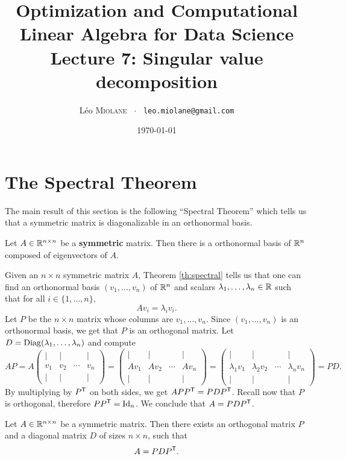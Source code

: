 \documentclass[11pt,nocut]{article}
\title{\vspace{-2.0cm}%
	Optimization and Computational Linear Algebra for Data Science\\
Lecture 7: Singular value decomposition}
\author{Léo \textsc{Miolane} \ $\cdot$ \ \texttt{leo.miolane@gmail.com}}
\date{\today}
\begin{document}
\maketitle


\section{The Spectral Theorem}

The main result of this section is the following ``Spectral Theorem'' which tells us that a symmetric matrix is diagonalizable in an orthonormal basis.

\begin{theorem}\label{th:spectral}
	Let $A \in \mathbb{R}^{n \times n}$ be a \textbf{symmetric} matrix. Then there is a orthonormal basis of $\mathbb{R}^n$ composed of eigenvectors of $A$.
\end{theorem}

Given an $n \times n$ symmetric matrix $A$, Theorem \ref{th:spectral} tells us that one can find an orthonormal basis $(v_1, \dots, v_n)$ of $\mathbb{R}^n$ and scalars $\lambda_1, \dots, \lambda_n \in \mathbb{R}$ such that for all $i \in \{1, \dots, n\}$,
$$
A v_i = \lambda_i v_i.
$$
Let $P$ be the $n \times n$ matrix whose columns are $v_1, \dots, v_n$. Since $(v_1, \dots, v_n)$ is an orthonormal basis, we get that $P$ is an orthogonal matrix. Let $D = {\rm Diag}(\lambda_1, \dots, \lambda_n)$ and compute
$$
A P
= 
A 
\begin{pmatrix}
	| & | & & | \\
	v_1 & v_2 & \cdots& v_n \\
	| & | & & |
\end{pmatrix}
= 
\begin{pmatrix}
	| & | & & | \\
	Av_1 & Av_2 & \cdots& Av_n \\
	| & | & & |
\end{pmatrix}
= 
\begin{pmatrix}
	| & | & & | \\
	\lambda_1 v_1 & \lambda_2 v_2 & \cdots& \lambda_n v_n \\
	| & | & & |
\end{pmatrix}
= P D.
$$
By multiplying by $P^{{\sf T}}$ on both sides, we get $A P P^{{\sf T}} = P D P^{{\sf T}}$. Recall now that $P$ is orthogonal, therefore $P P^{{\sf T}} = {{\rm Id}}_n$. We conclude that $A = P D P^{{\sf T}}$.

\begin{theorem}\label{th:spectral2}
	Let $A \in \mathbb{R}^{n \times n}$ be a symmetric matrix. Then there exists an orthogonal matrix $P$ and a diagonal matrix $D$ of sizes $n \times n$, such that
	$$
	A = P D P^{{\sf T}}.
	$$
\end{theorem}
\end{document}
